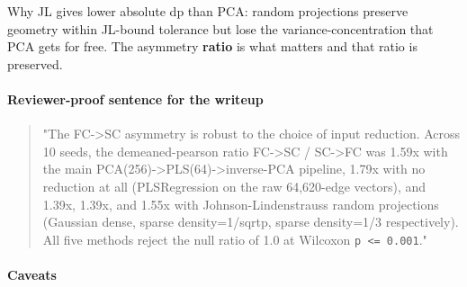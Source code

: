Why JL gives lower absolute dp than PCA: random projections preserve geometry within JL-bound tolerance but lose the variance-concentration that PCA gets for free. The asymmetry \textbf{ratio} is what matters and that ratio is preserved.

\paragraph{Reviewer-proof sentence for the writeup}\label{reviewer-proof-sentence-for-the-writeup}

\begin{quote}
"The FC-\textgreater SC asymmetry is robust to the choice of input reduction. Across 10 seeds, the demeaned-pearson ratio FC-\textgreater SC / SC-\textgreater FC was 1.59x with the main PCA(256)-\textgreater PLS(64)-\textgreater inverse-PCA pipeline, 1.79x with no reduction at all (PLSRegression on the raw 64,620-edge vectors), and 1.39x, 1.39x, and 1.55x with Johnson-Lindenstrauss random projections (Gaussian dense, sparse density=1/sqrtp, sparse density=1/3 respectively). All five methods reject the null ratio of 1.0 at Wilcoxon \texttt{p\ \textless{}=\ 0.001}."
\end{quote}

\paragraph{Caveats}\label{caveats}

